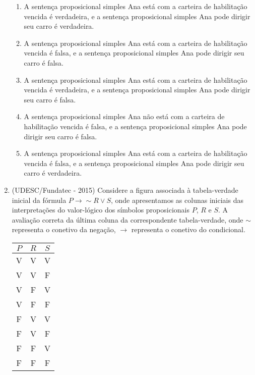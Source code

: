 \begin{enumerate}
  \begin{enumerate}
  \item A sentença proposicional simples Ana está com a carteira de habilitação vencida é verdadeira, e a sentença proposicional simples Ana pode dirigir seu carro é verdadeira.
  \item A sentença proposicional simples Ana está com a carteira de habilitação vencida é falsa, e a sentença proposicional simples Ana pode dirigir seu carro é falsa.
  \item A sentença proposicional simples Ana está com a carteira de habilitação vencida é verdadeira, e a sentença proposicional simples Ana pode dirigir seu carro é falsa.
  \item A sentença proposicional simples Ana não está com a carteira de habilitação vencida é falsa, e a sentença proposicional simples Ana pode dirigir seu carro é falsa.
  \item A sentença proposicional simples Ana está com a carteira de habilitação vencida é falsa, e a sentença proposicional simples Ana pode dirigir seu carro é verdadeira.
 \end{enumerate}


  \item (UDESC/Fundatec - 2015) Considere a figura associada à tabela-verdade inicial da fórmula $P \rightarrow \sim R \lor S$, onde apresentamos as colunas iniciais das interpretações do valor-lógico dos símbolos proposicionais $P$, $R$ e $S$. A avaliação correta da última coluna da correspondente tabela-verdade, onde $\sim$ representa o conetivo da negação, $\rightarrow$ representa o conetivo do condicional.

  \begin{table}[H]
 \centering
 \begin{tabular}{|c|c|c|} \hline
 $P$ & $R$ & $S$ \\ \hline
 V & V & V  \\ \hline
 V & V & F  \\ \hline
 V & F & V  \\ \hline
 V & F & F  \\ \hline
 F & V & V  \\ \hline
 F & V & F  \\ \hline
 F & F & V  \\ \hline
 F & F & F  \\ \hline
 \end{tabular}
 \end{table}


\end{enumerate}
